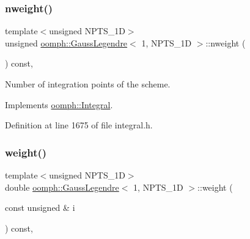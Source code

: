 \mbox{\label{classoomph_1_1GaussLegendre_3_011_00_01NPTS__1D_01_4_ad8b2aad0d4f7aa606fd0d89ee44fdd14}} 
\subsubsection{\texorpdfstring{nweight()}{nweight()}}
{\footnotesize\ttfamily template$<$unsigned N\+P\+T\+S\+\_\+1D$>$ \\
unsigned \hyperlink{classoomph_1_1GaussLegendre}{oomph\+::\+Gauss\+Legendre}$<$ 1, N\+P\+T\+S\+\_\+1D $>$\+::nweight (\begin{DoxyParamCaption}{ }\end{DoxyParamCaption}) const\hspace{0.3cm}{\ttfamily [inline]}, {\ttfamily [virtual]}}



Number of integration points of the scheme. 



Implements \hyperlink{classoomph_1_1Integral_a1a270de9d99a1fcf1d25a6c1017f65fa}{oomph\+::\+Integral}.



Definition at line 1675 of file integral.\+h.

\mbox{\label{classoomph_1_1GaussLegendre_3_011_00_01NPTS__1D_01_4_a264bcf0bdeb1738722da6d157eb140e7}} 
\subsubsection{\texorpdfstring{weight()}{weight()}}
{\footnotesize\ttfamily template$<$unsigned N\+P\+T\+S\+\_\+1D$>$ \\
double \hyperlink{classoomph_1_1GaussLegendre}{oomph\+::\+Gauss\+Legendre}$<$ 1, N\+P\+T\+S\+\_\+1D $>$\+::weight (\begin{DoxyParamCaption}\item[{const unsigned \&}]{i }\end{DoxyParamCaption}) const\hspace{0.3cm}{\ttfamily [inline]}, {\ttfamily [virtual]}}



